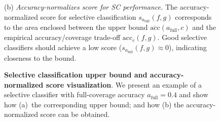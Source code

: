 \begin{figure}
\begin{minipage}{0.48\linewidth}
{{
    }}
    (b) \emph{Accuracy-normalizes score for SC performance.} The accuracy-normalized score for selective classification $s_{a_\text{full}}(f,g)$ corresponds to the area enclosed between the upper bound $\overline{\text{acc}}(a_\text{full},c)$ and the empirical accuracy/coverage trade-off $\text{acc}_c(f,g)$. Good selective classifiers should achieve a low score ($s_{a_\text{full}}(f,g) \approx 0$), indicating closeness to the bound.
    \label{fig:score}
\end{minipage}
\vspace{10pt}
    \caption[Selective classification upper bound and accuracy-normalized score visualization.]{\textbf{Selective classification upper bound and accuracy-normalized score visualization}. We present an example of a selective classifier with full-coverage accuracy $a_\text{full} = 0.4$ and show how (a)~the corresponding upper bound; and how (b) the accuracy-normalized score can be obtained. }
    \label{fig:bound_score}
\end{figure}

